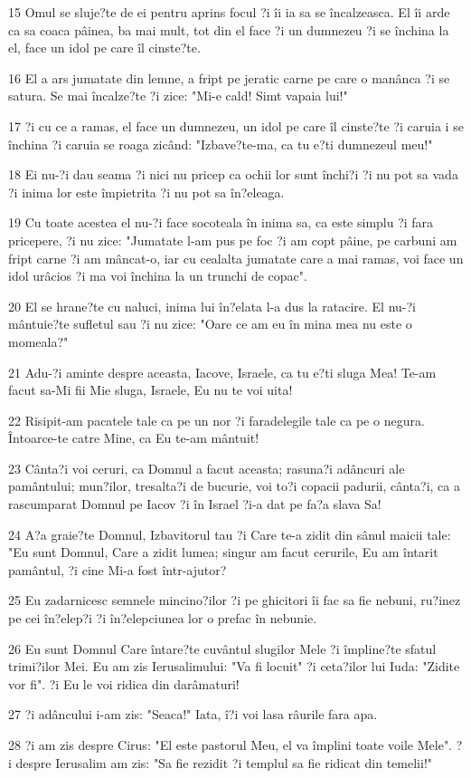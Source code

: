 \par 15 Omul se sluje?te de ei pentru aprins focul ?i îi ia sa se încalzeasca. El îi arde ca sa coaca pâinea, ba mai mult, tot din el face ?i un dumnezeu ?i se închina la el, face un idol pe care îl cinste?te.
\par 16 El a ars jumatate din lemne, a fript pe jeratic carne pe care o manânca ?i se satura. Se mai încalze?te ?i zice: "Mi-e cald! Simt vapaia lui!"
\par 17 ?i cu ce a ramas, el face un dumnezeu, un idol pe care îl cinste?te ?i caruia i se închina ?i caruia se roaga zicând: "Izbave?te-ma, ca tu e?ti dumnezeul meu!"
\par 18 Ei nu-?i dau seama ?i nici nu pricep ca ochii lor sunt închi?i ?i nu pot sa vada ?i inima lor este împietrita ?i nu pot sa în?eleaga.
\par 19 Cu toate acestea el nu-?i face socoteala în inima sa, ca este simplu ?i fara pricepere, ?i nu zice: "Jumatate l-am pus pe foc ?i am copt pâine, pe carbuni am fript carne ?i am mâncat-o, iar cu cealalta jumatate care a mai ramas, voi face un idol urâcios ?i ma voi închina la un trunchi de copac".
\par 20 El se hrane?te cu naluci, inima lui în?elata l-a dus la ratacire. El nu-?i mântuie?te sufletul sau ?i nu zice: "Oare ce am eu în mina mea nu este o momeala?"
\par 21 Adu-?i aminte despre aceasta, Iacove, Israele, ca tu e?ti sluga Mea! Te-am facut sa-Mi fii Mie sluga, Israele, Eu nu te voi uita!
\par 22 Risipit-am pacatele tale ca pe un nor ?i faradelegile tale ca pe o negura. Întoarce-te catre Mine, ca Eu te-am mântuit!
\par 23 Cânta?i voi ceruri, ca Domnul a facut aceasta; rasuna?i adâncuri ale pamântului; mun?ilor, tresalta?i de bucurie, voi to?i copacii padurii, cânta?i, ca a rascumparat Domnul pe Iacov ?i în Israel ?i-a dat pe fa?a slava Sa!
\par 24 A?a graie?te Domnul, Izbavitorul tau ?i Care te-a zidit din sânul maicii tale: "Eu sunt Domnul, Care a zidit lumea; singur am facut cerurile, Eu am întarit pamântul, ?i cine Mi-a fost într-ajutor?
\par 25 Eu zadarnicesc semnele mincino?ilor ?i pe ghicitori îi fac sa fie nebuni, ru?inez pe cei în?elep?i ?i în?elepciunea lor o prefac în nebunie.
\par 26 Eu sunt Domnul Care întare?te cuvântul slugilor Mele ?i împline?te sfatul trimi?ilor Mei. Eu am zis Ierusalimului: "Va fi locuit" ?i ceta?ilor lui Iuda: "Zidite vor fi". ?i Eu le voi ridica din darâmaturi!
\par 27 ?i adâncului i-am zis: "Seaca!" Iata, î?i voi lasa râurile fara apa.
\par 28 ?i am zis despre Cirus: "El este pastorul Meu, el va împlini toate voile Mele". ?i despre Ierusalim am zis: "Sa fie rezidit ?i templul sa fie ridicat din temelii!"

